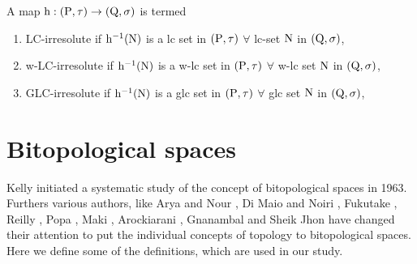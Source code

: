 \begin{dfn}\label{dfn1.5.3} 
A map $\mathrm{h}: (\mathrm{P}, \tau)\rightarrow (\mathrm{Q}, \sigma)$ is termed
\begin{enumerate}[\rm (i)]
\item LC-irresolute \cite{Reilly1} if $\mathrm{h}^{-1}(\mathrm{N})$ is a lc set in $(\mathrm{P},\tau)$ $\forall$ lc-set $\mathrm{N}$ in $(\mathrm{Q}, \sigma)$,
\item w-LC-irresolute \cite{Sheik} if $\mathrm{h}^{-1}(\mathrm{N})$ is a w-lc set in $(\mathrm{P},\tau)$ $\forall$ w-lc set $\mathrm{N}$ in $(\mathrm{Q}, \sigma)$,
\item GLC-irresolute \cite{Balachandran} if $\mathrm{h}^{-1}(\mathrm{N})$ is a glc set in $(\mathrm{P},\tau)$ $\forall$ glc set $\mathrm{N}$ in $(\mathrm{Q}, \sigma)$,
\end{enumerate}
\end{dfn}

\section{Bitopological spaces}

Kelly \cite{Kelly} initiated a systematic study of the concept of bitopological spaces in 1963. Furthers various authors, like Arya and Nour \cite{Arya2}, Di Maio and Noiri \cite{Noiri2}, Fukutake \cite{Fukutake2}, Reilly \cite{Reilly}, Popa \cite{Popa1}, Maki \cite{Maki6}, Arockiarani \cite{Arockiarani}, Gnanambal \cite{Gnanambal} and Sheik Jhon \cite{Sheik} have changed their attention to put the individual concepts of topology to bitopological spaces. Here we define some of the definitions, which are used in our study. 

